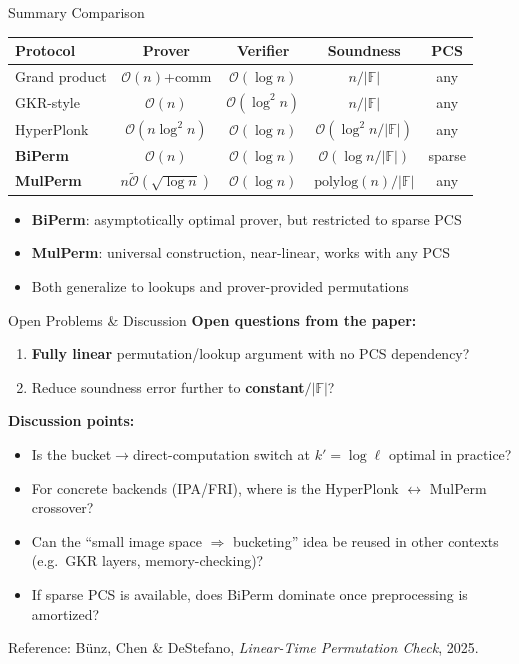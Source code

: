 \documentclass[aspectratio=169,10pt]{beamer}
\newcommand{\F}{\mathbb{F}}
\newcommand{\bigO}{\mathcal{O}}
\newcommand{\polylog}{\mathrm{polylog}}
\begin{document}
\begin{frame}{Summary Comparison}
\begin{center}
\small
\begin{tabular}{lcccc}
\toprule
Protocol & Prover & Verifier & Soundness & PCS \\
\midrule
Grand product & $\bigO(n)$+comm & $\bigO(\log n)$ & $n/|\F|$ & any \\
GKR-style & $\bigO(n)$ & $\bigO(\log^2 n)$ & $n/|\F|$ & any \\
HyperPlonk & $\bigO(n\log^2 n)$ & $\bigO(\log n)$ & $\bigO(\log^2 n/|\F|)$ & any \\
\midrule
\textbf{BiPerm} & $\bigO(n)$ & $\bigO(\log n)$ & $\bigO(\log n/|\F|)$ & sparse \\
\textbf{MulPerm} & $n\widetilde{\bigO}(\sqrt{\log n})$ & $\bigO(\log n)$ & $\polylog(n)/|\F|$ & any \\
\bottomrule
\end{tabular}
\end{center}

\vspace{0.6em}
\begin{itemize}
  \item \textbf{BiPerm}: asymptotically optimal prover, but restricted to sparse PCS
  \item \textbf{MulPerm}: universal construction, near-linear, works with any PCS
  \item Both generalize to lookups and prover-provided permutations
\end{itemize}
\end{frame}

\begin{frame}{Open Problems \& Discussion}
\textbf{Open questions from the paper:}
\begin{enumerate}
  \item \textbf{Fully linear} permutation/lookup argument with no PCS dependency?
  \item Reduce soundness error further to \textbf{constant$/|\F|$}?
\end{enumerate}

\vspace{0.8em}
\textbf{Discussion points:}
\begin{itemize}
  \item Is the bucket$\to$direct-computation switch at $k' = \log\ell$ optimal in practice?
  \item For concrete backends (IPA/FRI), where is the HyperPlonk $\leftrightarrow$ MulPerm crossover?
  \item Can the ``small image space $\Rightarrow$ bucketing'' idea be reused in other contexts (e.g.\ GKR layers, memory-checking)?
  \item If sparse PCS is available, does BiPerm dominate once preprocessing is amortized?
\end{itemize}

\vspace{0.8em}
\centering
\small Reference: B\"unz, Chen \& DeStefano, \emph{Linear-Time Permutation Check}, 2025.
\end{frame}
\end{document}
